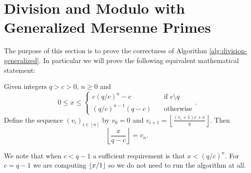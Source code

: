 
\section{Division and Modulo with Generalized Mersenne Primes}
\label{sec:division}

The purpose of this section is to prove the correctness of Algorithm \ref{alg:division-generalized}.
In particular we will prove the following equivalent mathematical statement:

\begin{theorem}\label{thm:simple-div}
   Given integers $q>c>0$, $n\ge 0$ and
   $$0\le x \le \begin{cases}
      c (q/c)^{n} - c &\quad\text{if } c \setminus q \\
      (q/c)^{n-1}(q-c) &\quad\text{otherwise}
   \end{cases}.$$
   Define the sequence $(v_i)_{i\in[n]}$ by
   $
      v_0 = 0$ and
      $v_{i+1} = \left\lfloor\frac{(v_i+1)c+x}{q}\right\rfloor$.
   Then
   $$
      \left\lfloor\frac{x}{q-c}\right\rfloor = v_n.$$
\end{theorem}
We note that when $c<q-1$ a sufficient requirement is that $x< (q/c)^n$.
For $c=q-1$ we are computing $\lfloor {x/1} \rfloor$ so we do not need to run the algorithm at all.

